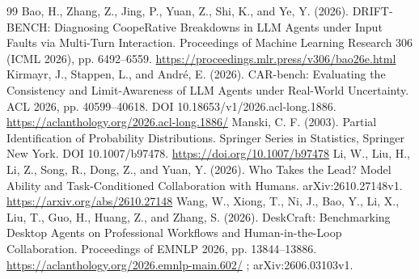 \begin{thebibliography}{99}
 Bao, H., Zhang, Z., Jing, P., Yuan, Z., Shi, K., and Ye, Y. (2026). DRIFT-BENCH: Diagnosing CoopeRative Breakdowns in LLM Agents under Input Faults via Multi-Turn Interaction. Proceedings of Machine Learning Research 306 (ICML 2026), pp. 6492--6559. \url{https://proceedings.mlr.press/v306/bao26e.html}
 Kirmayr, J., Stappen, L., and André, E. (2026). CAR-bench: Evaluating the Consistency and Limit-Awareness of LLM Agents under Real-World Uncertainty. ACL 2026, pp. 40599--40618. DOI 10.18653/v1/2026.acl-long.1886. \url{https://aclanthology.org/2026.acl-long.1886/}
 Manski, C. F. (2003). Partial Identification of Probability Distributions. Springer Series in Statistics, Springer New York. DOI 10.1007/b97478. \url{https://doi.org/10.1007/b97478}
 Li, W., Liu, H., Li, Z., Song, R., Dong, Z., and Yuan, Y. (2026). Who Takes the Lead? Model Ability and Task-Conditioned Collaboration with Humans. arXiv:2610.27148v1. \url{https://arxiv.org/abs/2610.27148}
 Wang, W., Xiong, T., Ni, J., Bao, Y., Li, X., Liu, T., Guo, H., Huang, Z., and Zhang, S. (2026). DeskCraft: Benchmarking Desktop Agents on Professional Workflows and Human-in-the-Loop Collaboration. Proceedings of EMNLP 2026, pp. 13844--13886. \url{https://aclanthology.org/2026.emnlp-main.602/} ; arXiv:2606.03103v1.
\end{thebibliography}
